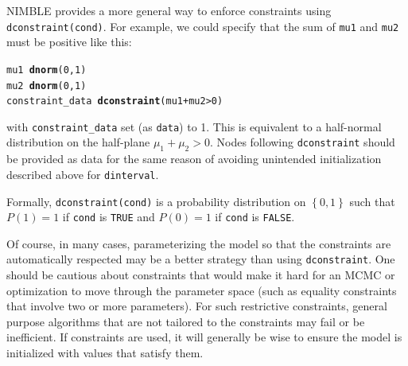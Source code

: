 \documentclass[12pt,oneside]{book}\usepackage[]{graphicx}\usepackage[]{color}
\makeatletter
\newcommand{\hlnum}[1]{\textcolor[rgb]{0.686,0.059,0.569}{#1}}%
\newcommand{\hlopt}[1]{\textcolor[rgb]{0,0,0}{#1}}%
\newcommand{\hlstd}[1]{\textcolor[rgb]{0.345,0.345,0.345}{#1}}%
\newcommand{\hlkwd}[1]{\textcolor[rgb]{0.737,0.353,0.396}{\textbf{#1}}}%
\newenvironment{kframe}{%
 \def\at@end@of@kframe{}%
 \ifinner\ifhmode%
  \def\at@end@of@kframe{\end{minipage}}%
  \begin{minipage}{\columnwidth}%
 \fi\fi%
 \def\FrameCommand##1{\hskip\@totalleftmargin \hskip-\fboxsep
 \colorbox{shadecolor}{##1}\hskip-\fboxsep
     \hskip-\linewidth \hskip-\@totalleftmargin \hskip\columnwidth}%
 \MakeFramed {\advance\hsize-\width
   \@totalleftmargin\z@ \linewidth\hsize
   \@setminipage}}%
 {\par\unskip\endMakeFramed%
 \at@end@of@kframe}
\newenvironment{knitrout}{}{} %
\def\cd#1{\texttt{#1}}
\makeatother
\begin{document}
NIMBLE provides a more general way to enforce constraints using \cd{dconstraint(cond)}.  For example, we could specify that the sum of \cd{mu1} and \cd{mu2} must be positive like this:
\begin{knitrout}
\color{fgcolor}\begin{kframe}
\begin{alltt}
\hlstd{mu1} \hlopt{~} \hlkwd{dnorm}\hlstd{(}\hlnum{0}\hlstd{,} \hlnum{1}\hlstd{)}
\hlstd{mu2} \hlopt{~} \hlkwd{dnorm}\hlstd{(}\hlnum{0}\hlstd{,} \hlnum{1}\hlstd{)}
\hlstd{constraint_data} \hlopt{~} \hlkwd{dconstraint}\hlstd{( mu1} \hlopt{+} \hlstd{mu2} \hlopt{>} \hlnum{0} \hlstd{)}
\end{alltt}
\end{kframe}
\end{knitrout}
with \cd{constraint\_data} set (as \cd{data}) to 1.  This is
equivalent to a half-normal distribution on the half-plane $\mu_1 +
\mu_2 > 0$.  Nodes following \cd{dconstraint} should be provided as data for the same reason of avoiding unintended initialization described above for \cd{dinterval}.


Formally, \cd{dconstraint(cond)} is a probability distribution on $\left\{ 0, 1 \right\}$ such that $P(1) = 1$ if \cd{cond} is \cd{TRUE} and $P(0) = 1$ if \cd{cond} is \cd{FALSE}. 


Of course, in many cases, parameterizing the model so that the
constraints are automatically respected may be a better strategy than
using \cd{dconstraint}.  One should be cautious about constraints that
would make it hard for an MCMC or optimization to move through the
parameter space (such as equality constraints that involve two or more
parameters). For such restrictive constraints, general purpose
algorithms that are not tailored to the constraints may fail or be inefficient. If constraints are used, it will generally be wise to ensure the model is initialized with values that satisfy them.
\end{document}

